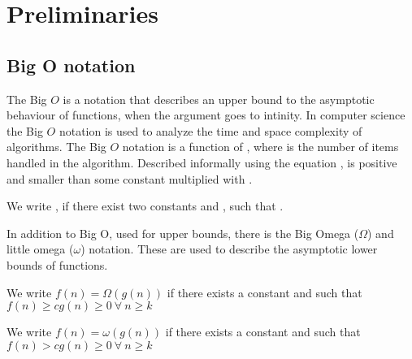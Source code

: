 \section{Preliminaries}

\subsection{Big O notation}

 The Big $O$ is a notation that describes an upper bound to the asymptotic behaviour of functions, when the argument goes to intinity. In computer science the Big $O$ notation is used to analyze the time and space complexity of algorithms. The Big $O$ notation is a function of , where  is the number of items handled in the algorithm. Described informally using the equation ,  is positive and smaller than some constant multiplied with .
 
 \begin{definition}
 We write , if there exist two constants
  and , such that .
 \end{definition}

In addition to Big O, used for upper bounds, there is the Big Omega ($\Omega$) and little omega ($\omega$) notation. These are used to describe the asymptotic lower bounds of functions. 

 \begin{definition}
 We write $f(n) = \Omega(g(n))$ if there exists a constant
  and  such that $f(n) \geq cg(n) \geq 0 \: \forall \: n \geq k$
 \end{definition}

 \begin{definition}
 We write $f(n) = \omega(g(n))$ if there exists a constant
  and  such that $f(n) > cg(n) \geq 0 \: \forall \: n \geq k$
 \end{definition}


